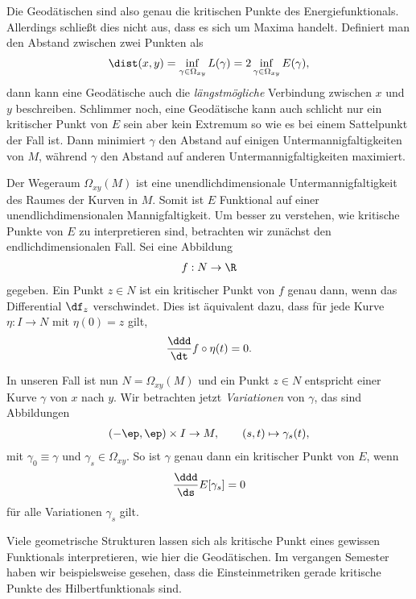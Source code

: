 \documentclass[%
	paper=a5,%
	fleqn,%
	DIV=18,%
	BCOR=0mm,
	fontsize=11pt,
	titlepage=false,%
	bibliography=totoc,
	DIV=18,%
	twoside=true,
	pdftitle=Riemannsche Geometrie,
	pdfauthor=Uwe Semmelmann,
	numbers=noendperiod]%
	{scrbook}
\begin{document}
Die Geodätischen sind also genau die kritischen Punkte des
Energiefunktionals. Allerdings schließt dies nicht aus, dass es sich um Maxima
handelt. Definiert man den Abstand zwischen zwei Punkten als
\begin{align*}
\dist(x,y) = \inf_{\gamma\in \Omega_{xy}} L(\gamma) = 2 \inf_{\gamma\in
\Omega_{xy}} E(\gamma),
\end{align*}
dann kann eine Geodätische auch die \textit{längstmögliche} Verbindung zwischen
$x$ und $y$ beschreiben. Schlimmer noch, eine Geodätische kann auch schlicht nur
ein kritischer Punkt von $E$ sein aber kein Extremum so wie es bei einem
Sattelpunkt der Fall ist. Dann minimiert $\gamma$ den Abstand auf einigen
Untermannigfaltigkeiten von $M$, während $\gamma$ den Abstand auf anderen
Untermannigfaltigkeiten maximiert.

\begin{rem}[Bemerkungen.]
\begin{remenum}
\item
Der Wegeraum $\Omega_{xy}(M)$ ist eine unendlichdimensionale
Untermannigfaltigkeit des Raumes der Kurven in $M$. Somit ist $E$ Funktional auf
einer unendlichdimensionalen Mannigfaltigkeit. Um besser zu verstehen, wie
kritische Punkte von $E$ zu interpretieren sind, betrachten wir zunächst den
endlichdimensionalen Fall. Sei eine Abbildung
\begin{align*}
f: N\to \R
\end{align*}
gegeben. Ein Punkt $z\in N$ ist ein kritischer Punkt von $f$ genau dann, wenn das Differential
$\df_z$ verschwindet. Dies ist äquivalent dazu, dass für jede Kurve $\eta\colon I\to N$ mit
$\eta(0) = z$ gilt,
\begin{align*}
\frac{\ddd}{\dt} f\circ\eta(t) = 0.
\end{align*}

In unseren Fall ist nun $N=\Omega_{xy}(M)$ und ein Punkt $z\in N$ entspricht
einer Kurve $\gamma$ von $x$ nach $y$. Wir betrachten jetzt \emph{Variationen}
von $\gamma$, das sind Abbildungen
\begin{align*}
(-\ep,\ep) \times I\to M,\qquad (s,t)\mapsto \gamma_s(t), 
\end{align*}
mit $\gamma_0\equiv \gamma$ und $\gamma_s\in\Omega_{xy}$. So ist $\gamma$ genau dann
ein kritischer Punkt von $E$, wenn
\begin{align*}
\frac{\ddd}{\ds} E[\gamma_s] = 0
\end{align*}
für alle Variationen $\gamma_s$ gilt.
\item 
Viele geometrische Strukturen lassen sich als kritische Punkt eines gewissen
Funktionals interpretieren, wie hier die Geodätischen. Im vergangen Semester
haben wir beispielsweise gesehen, dass die Einsteinmetriken gerade kritische
Punkte des Hilbertfunktionals sind.\map
\end{remenum}
\end{rem}
\end{document}
